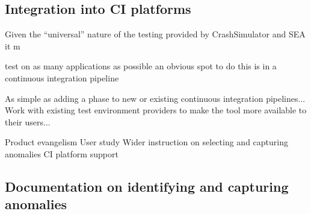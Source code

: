 \documentclass[twocolumn]{article}
\begin{document}
\subsection{Integration into CI platforms}

Given the ``universal'' nature of the testing provided by CrashSimulator
and SEA it m

test on as many applications as possible
an obvious spot to do this is in a continuous integration pipeline

As simple as adding a phase to new or existing continuous integration
pipelines...
Work with existing test environment providers to make the tool more
available to their users...

  Product evangelism
  User study
  Wider instruction on selecting and capturing anomalies
  CI platform support
\subsection{Documentation on identifying and capturing anomalies}
\end{document}
